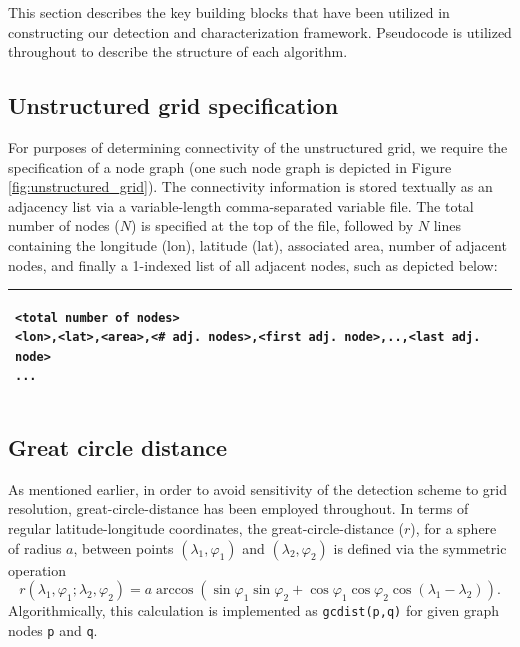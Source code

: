 \documentclass[gmdd, hvmath, online]{copernicus_discussions}
\begin{document}
This section describes the key building blocks that have been utilized in constructing our detection and characterization framework.  Pseudocode is utilized throughout to describe the structure of each algorithm.

\subsection{Unstructured grid specification}

For purposes of determining connectivity of the unstructured grid, we require the specification of a node graph (one such node graph is depicted in Figure \ref{fig:unstructured_grid}).  The connectivity information is stored textually as an adjacency list via a variable-length comma-separated variable file.  The total number of nodes ($N$) is specified at the top of the file, followed by $N$ lines containing the longitude (lon), latitude (lat), associated area, number of adjacent nodes, and finally a 1-indexed list of all adjacent nodes, such as depicted below:
\ \\

\noindent \begin{tabular}{|p{\textwidth}|}
\hline \small \begin{verbatim}
<total number of nodes>
<lon>,<lat>,<area>,<# adj. nodes>,<first adj. node>,..,<last adj. node>
...
\end{verbatim} \\
\hline
\end{tabular}

\subsection{Great circle distance}

As mentioned earlier, in order to avoid sensitivity of the detection scheme to grid resolution, great-circle-distance has been employed throughout.  In terms of regular latitude-longitude coordinates, the great-circle-distance ($r$), for a sphere of radius $a$, between points $(\lambda_1, \varphi_1)$ and $(\lambda_2, \varphi_2)$ is defined via the symmetric operation
\begin{equation}
r(\lambda_1, \varphi_1; \lambda_2, \varphi_2) = a \arccos \left( \sin \varphi_1 \sin \varphi_2 + \cos \varphi_1 \cos \varphi_2 \cos (\lambda_1 - \lambda_2) \right).
\end{equation}  Algorithmically, this calculation is implemented as \texttt{gcdist(p,q)} for given graph nodes \texttt{p} and \texttt{q}.
\end{document}
